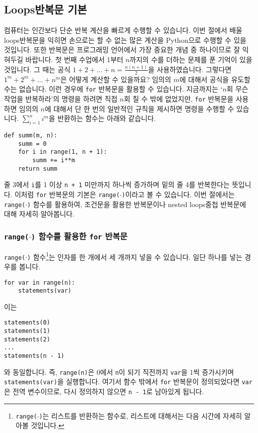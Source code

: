 \documentclass[../main.tex]{subfiles}
\begin{document}
\subsection{Loops반복문 기본}
컴퓨터는 인간보다 단순 반복 계산을 빠르게 수행할 수 있습니다.
이번 절에서 배울 loops반복문을 익히면 손으로는 할 수 없는 많은 계산을 Python으로 수행할 수 있을 것입니다.
또한 반복문은 프로그래밍 언어에서 가장 중요한 개념 중 하나이므로 잘 익혀두길 바랍니다.
첫 번째 수업에서 1부터 $n$까지의 수를 더하는 문제를 푼 기억이 있을 것입니다.
그 때는 공식 $1 + 2 + \dots + n = \frac{n(n + 1)}{2}$을 사용하였습니다.
그렇다면 $1^m + 2^m + \dots + n^m$은 어떻게 계산할 수 있을까요?
임의의 $m$에 대해서 공식을 유도할 수는 없습니다.
이런 경우에 \texttt{for} 반복문을 활용할 수 있습니다.
지금까지는 `$n$회 무슨 작업을 반복하라'의 명령을 하려면 직접 $n$회 칠 수 밖에 없었지만,  \texttt{for} 반복문을 사용하면 임의의 $n$에 대해서 단 한 번의 일반적인 규칙을 제시하면 명령을 수행할 수 있습니다.
$\sum_{i = 1}^n i^m$을 반환하는 함수는 아래와 같습니다.
\begin{verbatim}
def summ(m, n):
	summ = 0
	for i in range(1, n + 1):
		summ += i**m
	return summ
\end{verbatim}
줄 3에서 \texttt{i}를 1 이상 \texttt{n + 1} 미만까지 하나씩 증가하며 밑의 줄 4를 반복한다는 뜻입니다.
이처럼 \texttt{for} 반복문의 기본은 \texttt{range($\cdot$)}이라고 볼 수 있습니다.
이번 절에서는 \texttt{range($\cdot$)} 함수를 활용하여, 조건문을 활용한 반복문이나 nested loops중첩 반복문에 대해 자세히 알아봅니다.

\subsubsection{\texttt{range($\cdot$)} 함수를 활용한 \texttt{for} 반복문}
\texttt{range($\cdot$)} 함수\footnote{\texttt{range($\cdot$)}는 리스트를 반환하는 함수로, 리스트에 대해서는 다음 시간에 자세히 알아볼 것입니다.}는 인자를 한 개에서 세 개까지 넣을 수 있습니다.
일단 하나를 넣는 경우를 봅니다.
\begin{verbatim}
for var in range(n):
	statements(var)
\end{verbatim}
이는 
\begin{verbatim}
statements(0)
statements(1)
statements(2)
...
statements(n - 1)
\end{verbatim}
와 동일합니다.
즉, \texttt{range(n)}은 0에서 \texttt{n}이 되기 직전까지 \texttt{var}을 1씩 증가시키며 \texttt{statements(var)}을 실행합니다.
여기서 함수 밖에서 \texttt{for} 반복문이 정의되었다면 \texttt{var}은 전역 변수이므로, 다시 정의하지 않으면 \texttt{n - 1}로 남아있게 됩니다.
\end{document}

